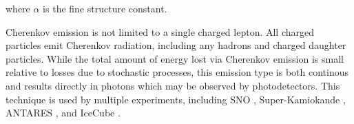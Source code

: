 where $\alpha$ is the fine structure constant.

Cherenkov emission is not limited to a single charged lepton. 
All charged particles emit Cherenkov radiation, including any hadrons and charged daughter particles.
While the total amount of energy lost via Cherenkov emission is small relative to losses due to stochastic processes, this emission type is both continous and results directly in photons which may be observed by photodetectors.
This technique is used by multiple experiments, including SNO \cite{Description-SNO}, Super-Kamiokande \cite{Description-SuperK}, ANTARES \cite{Description-ANTARES}, and IceCube \cite{Description-IceCube}.

